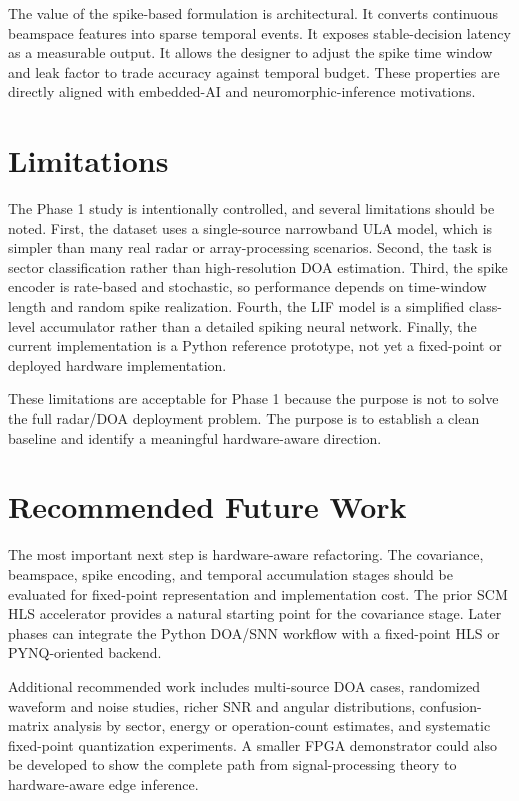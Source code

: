 \documentclass[11pt]{article}
\begin{document}
The value of the spike-based formulation is architectural. It converts continuous beamspace features into sparse temporal events. It exposes stable-decision latency as a measurable output. It allows the designer to adjust the spike time window and leak factor to trade accuracy against temporal budget. These properties are directly aligned with embedded-AI and neuromorphic-inference motivations.

\section{Limitations}

The Phase 1 study is intentionally controlled, and several limitations should be noted. First, the dataset uses a single-source narrowband ULA model, which is simpler than many real radar or array-processing scenarios. Second, the task is sector classification rather than high-resolution DOA estimation. Third, the spike encoder is rate-based and stochastic, so performance depends on time-window length and random spike realization. Fourth, the LIF model is a simplified class-level accumulator rather than a detailed spiking neural network. Finally, the current implementation is a Python reference prototype, not yet a fixed-point or deployed hardware implementation.

These limitations are acceptable for Phase 1 because the purpose is not to solve the full radar/DOA deployment problem. The purpose is to establish a clean baseline and identify a meaningful hardware-aware direction.

\section{Recommended Future Work}

The most important next step is hardware-aware refactoring. The covariance, beamspace, spike encoding, and temporal accumulation stages should be evaluated for fixed-point representation and implementation cost. The prior SCM HLS accelerator provides a natural starting point for the covariance stage. Later phases can integrate the Python DOA/SNN workflow with a fixed-point HLS or PYNQ-oriented backend.

Additional recommended work includes multi-source DOA cases, randomized waveform and noise studies, richer SNR and angular distributions, confusion-matrix analysis by sector, energy or operation-count estimates, and systematic fixed-point quantization experiments. A smaller FPGA demonstrator could also be developed to show the complete path from signal-processing theory to hardware-aware edge inference.
\end{document}
